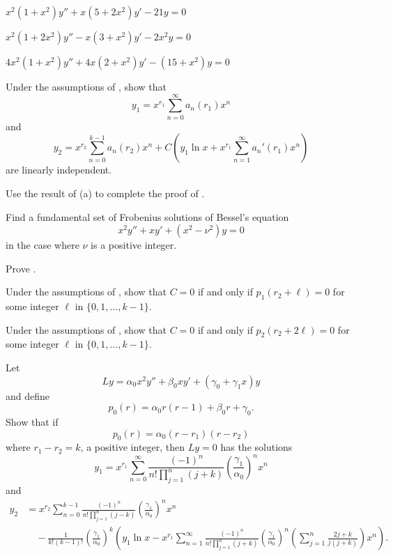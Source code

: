 \begin{exerciselist}
\item\label{exer:7.7.38}$x^2(1+x^2)y''+x(5+2x^2)y'-21y=0$

\item\label{exer:7.7.39}$x^2(1+2x^2)y''-x(3+x^2)y'-2x^2y=0$

\item\label{exer:7.7.40}$4x^2(1+x^2)y''+4x(2+x^2)y'-(15+x^2)y=0$

\item\label{exer:7.7.41}\begin{alist}
\item %
Under the assumptions of , show that
\[
y_1=x^{r_1}\sum_{n=0}^\infty  a_n(r_1)x^n
\]
and
\[
y_2=x^{r_2}\sum_{n=0}^{k-1}a_n(r_2)x^n+C\left(y_1\ln
x+x^{r_1}\sum_{n=1}^\infty a_n'(r_1)x^n\right)
\]
are linearly independent. 
\item %
Use the result of (a) to
complete the proof of .
\end{alist}


\item\label{exer:7.7.42}Find a fundamental set of Frobenius solutions of Bessel's equation
\[
x^2y''+xy'+(x^2-\nu^2)y=0
\]
in the case where $\nu$  is a positive integer.



\item\label{exer:7.7.43}Prove .

\item\label{exer:7.7.44}Under the assumptions of , show that $C=0$
 if and only if $p_1(r_2+\ell)=0$ for some
integer $\ell$ in $\{0,1,\dots,k-1\}$.


\item\label{exer:7.7.45}Under the assumptions of , show that $C=0$
 if and only if $p_2(r_2+2\ell)=0$ for some
integer $\ell$ in $\{0,1,\dots,k-1\}$.

\item\label{exer:7.7.46}Let
\[
Ly=\alpha_0x^2y''+\beta_0xy'+(\gamma_0+\gamma_1x)y
\]
and define
\[
p_0(r)=\alpha_0r(r-1)+\beta_0r+\gamma_0.
\]
Show that if
\[
p_0(r)=\alpha_0(r-r_1)(r-r_2)
\]
where $r_1-r_2=k$, a positive integer, then $Ly=0$ has the solutions
\[
y_1=x^{r_1}\sum_{n=0}^\infty\frac{(-1)^n}{n!\prod_{j=1}^n(j+k)}\left(\frac{\gamma_1}{\alpha_0}\right)^n x^n
\]
and
\begin{align*}
y_2&=x^{r_2}\sum_{n=0}^{k-1} \frac{(-1)^n}{n!\prod_{j=1}^n(j-k)}
\left(\frac{\gamma_1}{\alpha_0}\right)^n
x^n\\
&\quad{}-\frac{1}{k!(k-1)!}\left(\frac{\gamma_1}{\alpha_0}\right)^k\left(y_1\ln x-
x^{r_1}\sum_{n=1}^\infty\frac{(-1)^n}{n!\prod_{j=1}^n(j+k)}\left(\frac{\gamma_1}{\alpha_0}\right)^n
\left(\sum_{j=1}^n\frac{2j+k}{j(j+k)}\right)x^n\right).
\end{align*}



\end{exerciselist}
